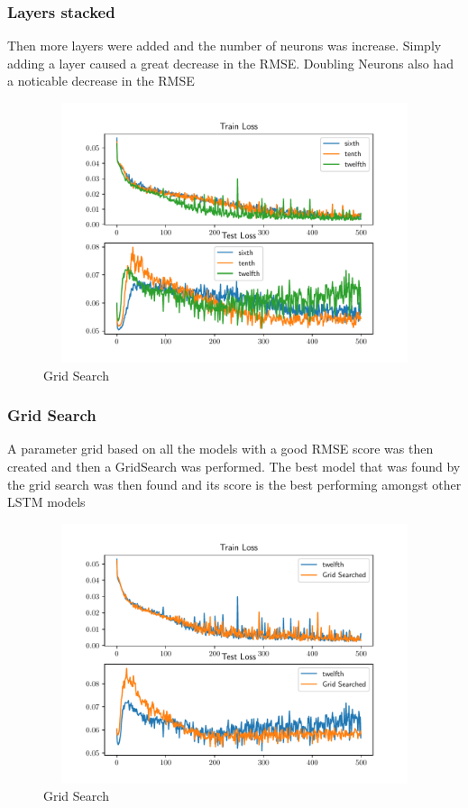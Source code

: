 \documentclass[10pt,11pt,12pt,oneside]{book}
\begin{document}
\subsubsection{Layers stacked}
Then more layers were added and the number of neurons was increase. Simply adding a layer caused a great decrease in the RMSE. Doubling Neurons also had a noticable decrease in the RMSE\\
\begin{figure}[H]
\centering
\includegraphics[width=5in,height=3in]{Data/layer_3.pdf}
\caption{Grid Search}
\label{fig:grid}
\end{figure}
\subsubsection{Grid Search}
A parameter grid based on all the models with a good RMSE score was then created and then a GridSearch was performed. The best model that was found by the grid search was then found and its score is the best performing amongst other LSTM models\\
\begin{figure}[H]
\centering
\includegraphics[width=5in,height=3in]{Data/grid_search.pdf}
\caption{Grid Search}
\label{fig:grid}
\end{figure}
\end{document}
